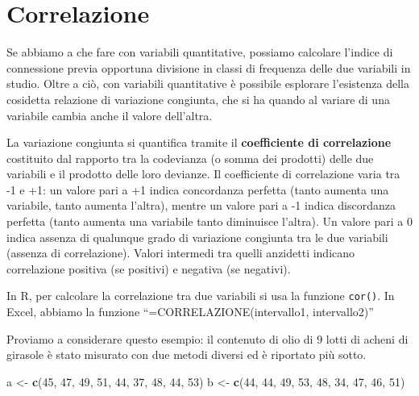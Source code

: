 \documentclass[a4paper,12pt,oneside]{book}
\newenvironment{Shaded}{\begin{snugshade}}{\end{snugshade}}
\newcommand{\KeywordTok}[1]{\textcolor[rgb]{0.13,0.29,0.53}{\textbf{#1}}}
\newcommand{\DecValTok}[1]{\textcolor[rgb]{0.00,0.00,0.81}{#1}}
\newcommand{\StringTok}[1]{\textcolor[rgb]{0.31,0.60,0.02}{#1}}
\newcommand{\NormalTok}[1]{#1}
\begin{document}
\chapter{Correlazione}\label{correlazione}

Se abbiamo a che fare con variabili quantitative, possiamo calcolare
l'indice di connessione previa opportuna divisione in classi di
frequenza delle due variabili in studio. Oltre a ciò, con variabili
quantitative è possibile esplorare l'esistenza della cosidetta relazione
di variazione congiunta, che si ha quando al variare di una variabile
cambia anche il valore dell'altra.

La variazione congiunta si quantifica tramite il \textbf{coefficiente di
correlazione} costituito dal rapporto tra la codevianza (o somma dei
prodotti) delle due variabili e il prodotto delle loro devianze. Il
coefficiente di correlazione varia tra -1 e +1: un valore pari a +1
indica concordanza perfetta (tanto aumenta una variabile, tanto aumenta
l'altra), mentre un valore pari a -1 indica discordanza perfetta (tanto
aumenta una variabile tanto diminuisce l'altra). Un valore pari a 0
indica assenza di qualunque grado di variazione congiunta tra le due
variabili (assenza di correlazione). Valori intermedi tra quelli
anzidetti indicano correlazione positiva (se positivi) e negativa (se
negativi).

In R, per calcolare la correlazione tra due variabili si usa la funzione
\texttt{cor()}. In Excel, abbiamo la funzione
``=CORRELAZIONE(intervallo1, intervallo2)''

Proviamo a considerare questo esempio: il contenuto di olio di 9 lotti
di acheni di girasole è stato misurato con due metodi diversi ed è
riportato più sotto.

\begin{Shaded}
\begin{Highlighting}[]
\NormalTok{a <-}\StringTok{ }\KeywordTok{c}\NormalTok{(}\DecValTok{45}\NormalTok{, }\DecValTok{47}\NormalTok{, }\DecValTok{49}\NormalTok{, }\DecValTok{51}\NormalTok{, }\DecValTok{44}\NormalTok{, }\DecValTok{37}\NormalTok{, }\DecValTok{48}\NormalTok{, }\DecValTok{44}\NormalTok{, }\DecValTok{53}\NormalTok{)}
\NormalTok{b <-}\StringTok{ }\KeywordTok{c}\NormalTok{(}\DecValTok{44}\NormalTok{, }\DecValTok{44}\NormalTok{, }\DecValTok{49}\NormalTok{, }\DecValTok{53}\NormalTok{, }\DecValTok{48}\NormalTok{, }\DecValTok{34}\NormalTok{, }\DecValTok{47}\NormalTok{, }\DecValTok{46}\NormalTok{, }\DecValTok{51}\NormalTok{)}
\end{Highlighting}
\end{Shaded}
\end{document}
